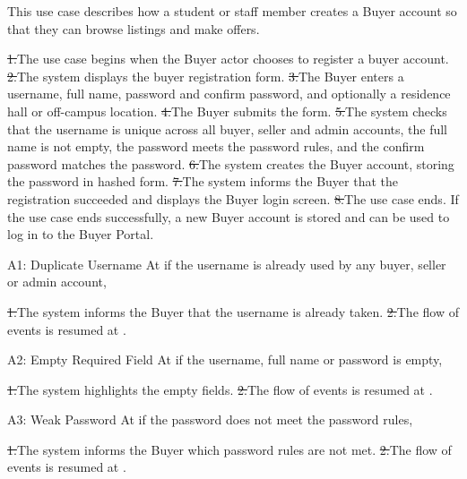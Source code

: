 
\clearpage
{}
This use case describes how a student or staff member creates a Buyer account so that they can browse listings and make offers.\par
{}
\st{1.}{The use case begins when the Buyer actor chooses to register a buyer account.}
\st{2.}{The system displays the buyer registration form.}
\st{3.}{The Buyer enters a username, full name, password and confirm password, and optionally a residence hall or off-campus location.}
\st{4.}{The Buyer submits the form.}
\st{5.}{The system checks that the username is unique across all buyer, seller and admin accounts, the full name is not empty, the password meets the password rules, and the confirm password matches the password.}
\st{6.}{The system creates the Buyer account, storing the password in hashed form.}
\st{7.}{The system informs the Buyer that the registration succeeded and displays the Buyer login screen.}
\st{8.}{The use case ends.}
If the use case ends successfully, a new Buyer account is stored and can be used to log in to the Buyer Portal.\par
{}
\begin{flowblock}{A1: Duplicate Username}
At  if the username is already used by any buyer, seller or admin account,\par
\st{1.}{The system informs the Buyer that the username is already taken.}
\st{2.}{The flow of events is resumed at .}
\end{flowblock}
\begin{flowblock}{A2: Empty Required Field}
At  if the username, full name or password is empty,\par
\st{1.}{The system highlights the empty fields.}
\st{2.}{The flow of events is resumed at .}
\end{flowblock}
\begin{flowblock}{A3: Weak Password}
At  if the password does not meet the password rules,\par
\st{1.}{The system informs the Buyer which password rules are not met.}
\st{2.}{The flow of events is resumed at .}
\end{flowblock}
